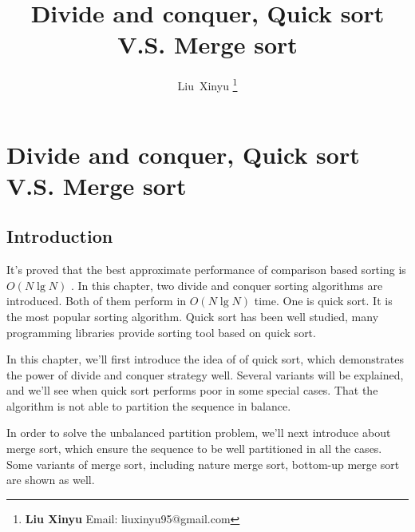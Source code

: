 \documentclass{article}
\begin{document}
\fi


\title{Divide and conquer, Quick sort V.S. Merge sort}

\author{Liu~Xinyu
\thanks{{\bfseries Liu Xinyu } \newline
  Email: liuxinyu95@gmail.com \newline}
  }


\maketitle

\ifx\wholebook\relax
\chapter{Divide and conquer, Quick sort V.S. Merge sort}
\fi

\section{Introduction}
\label{introduction} 

It's proved that the best approximate performance of comparison based sorting is $O(N \lg N)$ \cite{TAOCP}.
In this chapter, two divide and conquer sorting algorithms are introduced. Both of them
perform in $O(N \lg N)$ time. One is quick sort. It is
the most popular sorting algorithm. Quick sort has been well studied, many programming libraries provide
sorting tool based on quick sort. 

In this chapter, we'll first introduce the idea of of quick sort, which demonstrates the power of divide 
and conquer strategy well. Several variants will be explained, and we'll see when quick sort performs poor
in some special cases. That the algorithm is not able to partition the sequence in balance.

In order to solve the unbalanced partition problem, we'll next introduce about merge sort, which ensure
the sequence to be well partitioned in all the cases. Some variants of merge sort, including nature merge
sort, bottom-up merge sort are shown as well.
\end{document}
